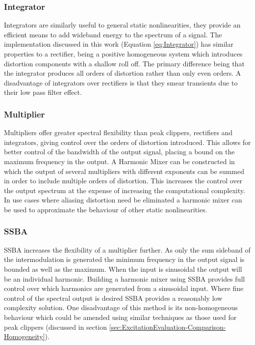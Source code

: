 		\subsubsection*{Integrator}
			Integrators are similarly useful to general static nonlinearities, they provide an efficient means
			to add wideband energy to the spectrum of a signal. The implementation discussed in this work
			(Equation \ref{eq:Integrator}) has similar properties to a rectifier, being a positive homogeneous
			system which introduces distortion components with a shallow roll off. The primary difference being
			that the integrator produces all orders of distortion rather than only even orders. A disadvantage
			of integrators over rectifiers is that they smear transients due to their low pass filter effect.

		\subsubsection*{Multiplier}
			Multipliers offer greater spectral flexibility than peak clippers, rectifiers and integrators,
			giving control over the orders of distortion introduced. This allows for better control of the
			bandwidth of the output signal, placing a bound on the maximum frequency in the output. A Harmonic
			Mixer can be constructed in which the output of several multipliers with different exponents can be
			summed in order to include multiple orders of distortion. This increases the control over the
			output spectrum at the expense of increasing the computational complexity. In use cases where
			aliasing distortion need be eliminated a harmonic mixer can be used to approximate the behaviour of
			other static nonlinearities.

		\subsubsection*{SSBA}
			SSBA increases the flexibility of a multiplier further. As only the sum sideband of the
			intermodulation is generated the minimum frequency in the output signal is bounded as well as the
			maximum. When the input is sinusoidal the output will be an individual harmonic. Building a
			harmonic mixer using SSBA provides full control over which harmonics are generated from a
			sinusoidal input. Where fine control of the spectral output is desired SSBA provides a reasonably
			low complexity solution. One disadvantage of this method is its non-homogeneous behaviour which
			could be amended using similar techniques as those used for peak clippers (discussed in section
			\ref{sec:ExcitationEvaluation-Comparison-Homogeneity}).

